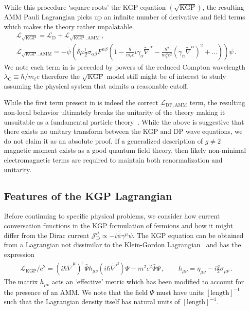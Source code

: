 While this procedure `square roots' the KGP equation $(\mathrm{\sqrt{KGP}})$, the resulting AMM Pauli Lagrangian  picks up an infinite number of derivative and field terms which makes the theory rather unpalatable.
\begin{gather}
    \label{lamm:2}
    \mathcal{L}_{\sqrt{\mathrm{KGP}}} = \mathcal{L}_\mathrm{D}+\mathcal{L}_\mathrm{\sqrt{KGP},AMM}\,,\\
    \label{lamm:3}
    \mathcal{L}_\mathrm{\sqrt{KGP},AMM} = -{\bar\psi}\left(\delta\mu\frac{1}{2}\sigma_{\alpha\beta}F^{\alpha\beta}\left(1 - \frac{\hbar}{m_{\ell}c}i\gamma_{\alpha}\widetilde\nabla^{\alpha} - \frac{\hbar^{2}}{m_{\ell}^{2}c^{2}}\left(\gamma_{\alpha}\widetilde\nabla^{\alpha}\right)^{2} + \ldots\right)\right)\psi\,.
\end{gather}
We note each term in  is preceded by powers of the reduced Compton wavelength $\lambda_\mathrm{C}\!\equiv\!\hbar/m_{\ell}c$ therefore the $\sqrt{\mathrm{KGP}}$ model still might be of interest to study assuming the physical system that admits a reasonable cutoff.

While the first term present in  is indeed the correct $\mathcal{L}_\mathrm{DP,AMM}$ term, the resulting non-local behavior ultimately breaks the unitarity of the theory making it unsuitable as a fundamental particle theory~\citep{Veltman:1997am}. While the above is suggestive that there exists no unitary transform between the KGP and DP wave equations, we do not claim it as an absolute proof. If a generalized description of $g\!\neq\!2$ magnetic moment exists as a good quantum field theory, then likely non-minimal electromagnetic terms are required to maintain both renormalization and unitarity.

\subsection{Features of the KGP Lagrangian}
\label{sec:lagrangian}
\noindent Before continuing to specific physical problems, we consider how current conversation functions in the KGP formulation of fermions and how it might differ from the Dirac current $\mathcal{J}_\mathrm{D}^{\mu}\propto-i\bar\psi\gamma^{\mu}\psi$. The KGP equation can be obtained from a Lagrangian not dissimilar to the Klein-Gordon Lagrangian~\citep{Delgado-Acosta:2010ita} and has the expression
\begin{gather}
\label{lagrangian:1} \mathcal{L}_\mathrm{KGP}/c^{2}=\left(i\hbar{\widetilde\nabla}^{\mu}\right)^{\dag}\bar{\Psi}h_{\mu\nu}\left(i\hbar{\widetilde\nabla}^{\mu}\right)\Psi-m^{2}c^{2}\bar{\Psi}\Psi\,,\qquad h_{\mu\nu}=\eta_{\mu\nu}-i\frac{g}{2}\sigma_{\mu\nu}\,.
\end{gather}
The matrix $h_{\mu\nu}$ acts an `effective' metric which has been modified to account for the presence of an AMM. We note that the field $\Psi$ must have units $[\mathrm{length}]^{-1}$ such that the Lagrangian density itself has natural units of $[\mathrm{length}]^{-4}$.

